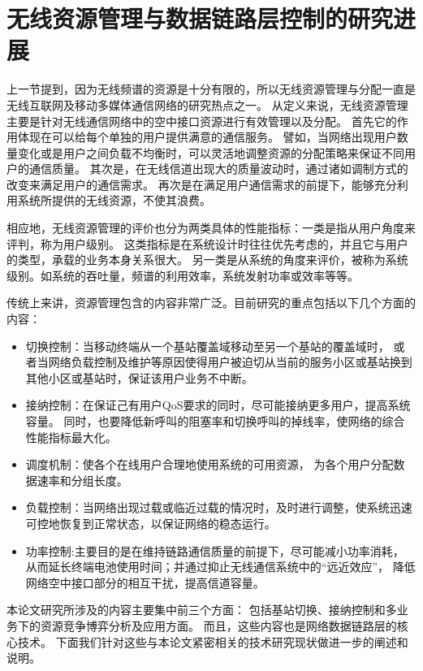 \section{无线资源管理与数据链路层控制的研究进展}
上一节提到，因为无线频谱的资源是十分有限的，所以无线资源管理与分配一直是无线互联网及移动多媒体通信网络的研究热点之一。
从定义来说，无线资源管理主要是针对无线通信网络中的空中接口资源进行有效管理以及分配。
首先它的作用体现在可以给每个单独的用户提供满意的通信服务。
譬如，当网络出现用户数量变化或是用户之间负载不均衡时，可以灵活地调整资源的分配策略来保证不同用户的通信质量。
其次是，在无线信道出现大的质量波动时，通过诸如调制方式的改变来满足用户的通信需求。
再次是在满足用户通信需求的前提下，能够充分利用系统所提供的无线资源，不使其浪费。

相应地，无线资源管理的评价也分为两类具体的性能指标：一类是指从用户角度来评判，称为用户级别。
这类指标是在系统设计时往往优先考虑的，并且它与用户的类型，承载的业务本身关系很大。
另一类是从系统的角度来评价，被称为系统级别。如系统的吞吐量，频谱的利用效率，系统发射功率或效率等等。

%
传统上来讲，资源管理包含的内容非常广泛。目前研究的重点包括以下几个方面的内容：

\begin{itemize}
\item 切换控制：当移动终端从一个基站覆盖域移动至另一个基站的覆盖域时，
    或者当网络负载控制及维护等原因使得用户被迫切从当前的服务小区或基站换到其他小区或基站时，保证该用户业务不中断。
\item 接纳控制：在保证己有用户QoS要求的同时，尽可能接纳更多用户，提高系统容量。 同时，也要降低新呼叫的阻塞率和切换呼叫的掉线率，使网络的综合性能指标最大化。 
 \item 调度机制：使各个在线用户合理地使用系统的可用资源，
    为各个用户分配数据速率和分组长度。
\item 负载控制：当网络出现过载或临近过载的情况时，及时进行调整，使系统迅速可控地恢复到正常状态，以保证网络的稳态运行。
\item 功率控制:主要目的是在维持链路通信质量的前提下，尽可能减小功率消耗，
从而延长终端电池使用时间；并通过抑止无线通信系统中的“远近效应”，
降低网络空中接口部分的相互干扰，提高信道容量。
\end{itemize}

本论文研究所涉及的内容主要集中前三个方面：
包括基站切换、接纳控制和多业务下的资源竞争博弈分析及应用方面。
而且，这些内容也是网络数据链路层的核心技术。
下面我们针对这些与本论文紧密相关的技术研究现状做进一步的阐述和说明。

